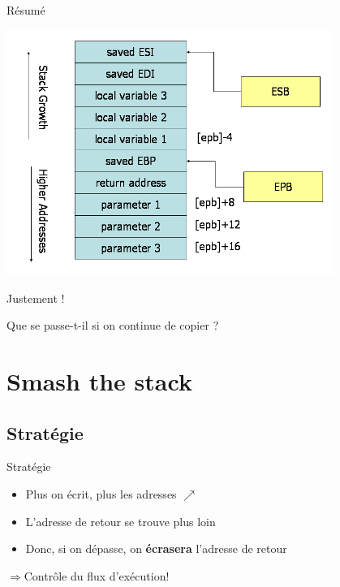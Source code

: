 \documentclass{beamer}
\begin{document}
\begin{frame}{Résumé}
	\begin{center}
		\includegraphics[width=0.8\textwidth]{images/stack-convention.png}
	\end{center}
\end{frame}

\begin{frame}{Justement !}
	\begin{center}
		\Large Que se passe-t-il si on continue de copier ?
	\end{center}
\end{frame}

\section{Smash the stack}
\subsection{Stratégie}

\begin{frame}{Stratégie}
	\begin{itemize}
		\itemsep1.3em
		\item Plus on écrit, plus les adresses \Large{$\nearrow$}
		\item L'adresse de retour se trouve plus loin
		\item Donc, si on dépasse, on \textbf{écrasera} l'adresse de retour
	\end{itemize}
	\begin{center}
		\Large $\Rightarrow$Contrôle du flux d'exécution!
	\end{center}
\end{frame}
\end{document}
